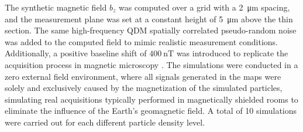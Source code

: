 \documentclass[onecolumn,12pt,a4paper]{article}
\providecommand{\DIFaddtex}[1]{{\protect\color{blue}\uwave{#1}}} %
\providecommand{\DIFaddbegin}{} %
\providecommand{\DIFaddend}{} %
\providecommand{\DIFadd}[1]{\texorpdfstring{\DIFaddtex{#1}}{#1}} %
\newcommand{\DIFaddincludegraphics}[2][]{{\color{blue}\fbox{\DIFOincludegraphics[#1]{#2}}}} %
\DeclareRobustCommand{\DIFaddbegin}{\DIFOaddbegin \let\includegraphics\DIFaddincludegraphics} %
\DeclareRobustCommand{\DIFaddend}{\DIFOaddend \let\includegraphics\DIFOincludegraphics} %
\begin{document}
The synthetic magnetic field \(b_z\) was computed over a grid with a \qty{2}{\um} spacing, and the measurement plane was set at a constant height of \qty{5}{\um} above the thin section. The same high-frequency QDM spatially correlated pseudo-random noise was added to the computed field to mimic realistic measurement conditions. Additionally, a positive baseline shift of \(\qty{400}{\nano\tesla}\) \citep[following][]{Hess2024} was introduced to replicate the acquisition process in magnetic microscopy \DIFaddbegin \DIFadd{using QDM}\DIFaddend . The simulations were conducted in a zero external field environment, where all signals generated in the maps were solely and exclusively caused by the magnetization of the simulated particles, simulating real acquisitions typically performed in magnetically shielded rooms to eliminate the influence of the Earth's geomagnetic field. A total of 10 simulations were carried out for each different particle density level.
\end{document}
